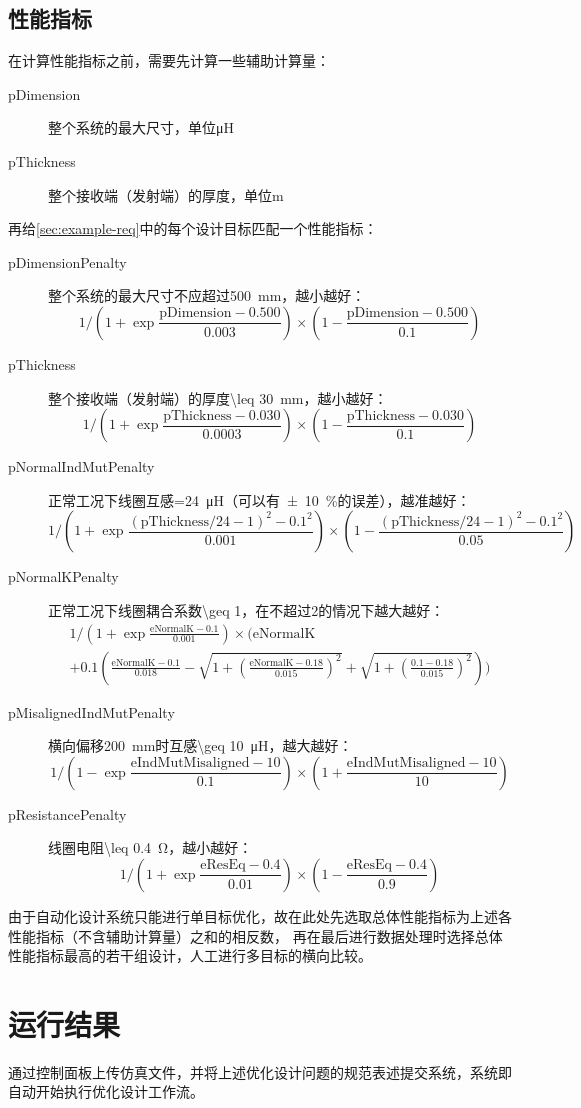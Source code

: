 \documentclass[index]{subfiles}
\begin{document}
\subsection{性能指标}
在计算性能指标之前，需要先计算一些辅助计算量：
\begin{description}
  \item[pDimension] 整个系统的最大尺寸，单位\si{\micro\henry}
  \item[pThickness] 整个接收端（发射端）的厚度，单位\si{\metre}
\end{description}
再给\cref{sec:example-req}中的每个设计目标匹配一个性能指标：
\begin{description}
  \item[pDimensionPenalty] 整个系统的最大尺寸不应超过\SI{500}{\milli\metre}，越小越好：
  \[1{\Big/}\!\left(1+\exp \frac{\text{pDimension}-0.500}{0.003}\right)\times\left(1 - \frac{\text{pDimension}-0.500}{0.1}\right)\]
  \item[pThickness] 整个接收端（发射端）的厚度\SI{\leq 30}{\milli\metre}，越小越好：
  \[1{\Big/}\!\left(1+\exp \frac{\text{pThickness}-0.030}{0.0003}\right)\times\left(1 - \frac{\text{pThickness}-0.030}{0.1}\right)\]
  \item[pNormalIndMutPenalty] 正常工况下线圈互感\SI{=24}{\micro\henry}（可以有\SI{\pm 10}{\percent}的误差），越准越好：
  \[1{\Big/}\!\left(1+\exp \frac{(\text{pThickness}/24-1)^2-0.1^2}{0.001}\right)\times\left(1 - \frac{(\text{pThickness}/24-1)^2-0.1^2}{0.05}\right)\]
  \item[pNormalKPenalty] 正常工况下线圈耦合系数\num{\geq 1}，在不超过2的情况下越大越好：
  \[
  \begin{multlined}
  1{\Big/}\!\left(1+\exp \frac{\text{eNormalK}-0.1}{0.001}\right)\times{\Bigg(}\text{eNormalK} \\
  + 0.1\left(\frac{\text{eNormalK}-0.1}{0.018} - \sqrt{1+\left(\scriptstyle\frac{\text{eNormalK}-0.18}{0.015}\right)^2}
  + \sqrt{1+\left(\scriptstyle\frac{0.1-0.18}{0.015}\right)^2}\right){\Bigg)}
  \end{multlined}
  \]
  \item[pMisalignedIndMutPenalty] 横向偏移\SI{200}{\milli\metre}时互感\SI{\geq 10}{\micro\henry}，越大越好：
  \[1{\Big/}\!\left(1-\exp \frac{\text{eIndMutMisaligned}-10}{0.1}\right)\times\left(1 + \frac{\text{eIndMutMisaligned}-10}{10}\right)\]
  \item[pResistancePenalty] 线圈电阻\SI{\leq 0.4}{\ohm}，越小越好：
  \[1{\Big/}\!\left(1+\exp \frac{\text{eResEq}-0.4}{0.01}\right)\times\left(1 - \frac{\text{eResEq}-0.4}{0.9}\right)\]
\end{description}

由于自动化设计系统只能进行单目标优化，故在此处先选取总体性能指标为上述各性能指标（不含辅助计算量）之和的相反数，
再在最后进行数据处理时选择总体性能指标最高的若干组设计，人工进行多目标的横向比较。

\section{运行结果}
通过控制面板上传仿真文件，并将上述优化设计问题的规范表述提交系统，系统即自动开始执行优化设计工作流。
\end{document}
